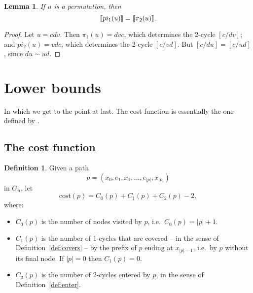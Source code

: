 \documentclass[a4paper]{article}
\newtheorem{lemma}{Lemma}
\theoremstyle{definition}
\newtheorem{defn}{Definition}[section]
\theoremstyle{remark}
\begin{document}
\begin{lemma}\label{lem:pi12}
    If $u$ is a permutation, then
    \[
        \llbracket pi_1(u)\rrbracket = \llbracket\pi_2(u)\rrbracket.
    \]
\end{lemma}
\begin{proof}
Let $u = cdv$. Then $\pi_1(u) = dvc$, which determines the 2-cycle $[c/dv]$; and $pi_2(u) = vdc$, which determines the 2-cycle $[c/vd]$. But $[c/du] = [c/ud]$, since $du \sim ud$.
\end{proof}

\section{Lower bounds}
In which we get to the point at last. The cost function is essentially the one defined by \citet{Anonymous}.

\subsection{The cost function}
\def\cost{\mathrm{cost}}

\begin{defn}\label{def:cost}
    Given a path \[
        p = (x_0, e_1, x_1, \dots, e_{|p|}, x_{|p|})
    \] in $G_n$, let \[
        \cost(p) = C_0(p) + C_1(p) + C_2(p) - 2,
    \]
    where:
    \begin{itemize}
    \item $C_0(p)$ is the number of nodes visited by $p$, i.e.\ $C_0(p) = |p| + 1$.
    \item $C_1(p)$ is the number of 1-cycles that are covered -- in the sense of Definition~\ref{def:covers} -- by the prefix of $p$ ending at $x_{|p|-1}$, i.e.\ by $p$ without its final node. If $|p|=0$ then $C_1(p)=0$.
    \item $C_2(p)$ is the number of 2-cycles entered by $p$, in the sense of Definition~\ref{def:enter}.
    \end{itemize}
\end{defn}
\end{document}
